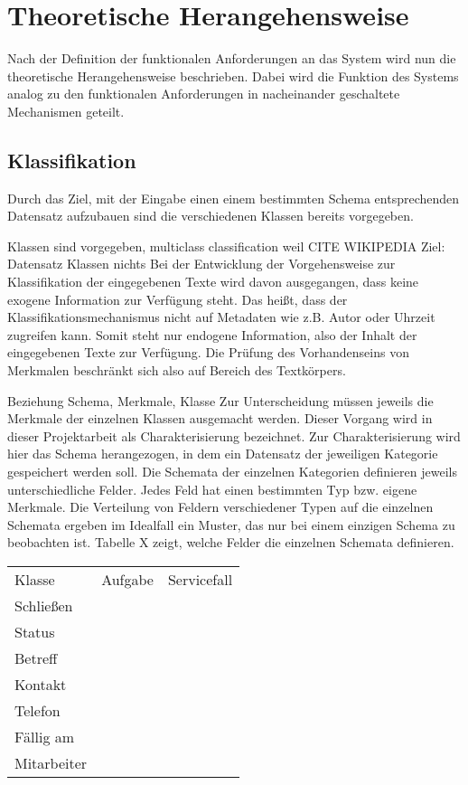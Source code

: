 \chapter{Theoretische Herangehensweise}
Nach der Definition der funktionalen Anforderungen an das System wird nun die theoretische Herangehensweise beschrieben. Dabei wird die Funktion des Systems analog zu den funktionalen Anforderungen in nacheinander geschaltete Mechanismen geteilt.

\section{Klassifikation}
Durch das Ziel, mit der Eingabe einen einem bestimmten Schema entsprechenden Datensatz aufzubauen sind die verschiedenen Klassen bereits vorgegeben. 

Klassen sind vorgegeben, multiclass classification weil CITE WIKIPEDIA
Ziel: Datensatz
Klassen nichts
Bei der Entwicklung der Vorgehensweise zur Klassifikation der eingegebenen Texte wird davon ausgegangen, dass keine exogene Information zur Verfügung steht. Das heißt, dass der Klassifikationsmechanismus nicht auf Metadaten wie z.B. Autor oder Uhrzeit zugreifen kann. Somit steht nur endogene Information, also der Inhalt der eingegebenen Texte zur Verfügung. Die Prüfung des Vorhandenseins von Merkmalen beschränkt sich also auf Bereich des Textkörpers. \cite{sebastiano}

Beziehung Schema, Merkmale, Klasse
Zur Unterscheidung müssen jeweils die Merkmale der einzelnen Klassen ausgemacht werden. Dieser Vorgang wird in dieser Projektarbeit als Charakterisierung bezeichnet. Zur Charakterisierung wird hier das Schema herangezogen, in dem ein Datensatz der jeweiligen Kategorie gespeichert werden soll. Die Schemata der einzelnen Kategorien definieren jeweils unterschiedliche Felder. 
Jedes Feld hat einen bestimmten Typ bzw. eigene Merkmale.
Die Verteilung von Feldern verschiedener Typen auf die einzelnen Schemata ergeben im Idealfall ein Muster, das nur bei einem einzigen Schema zu beobachten ist.
Tabelle X zeigt, welche Felder die einzelnen Schemata definieren.

\begin{tabular}{lll}
    Klasse & Aufgabe & Servicefall \\
    Schließen \\
    Status \\
    Betreff \\
    Kontakt \\
    Telefon \\
    Fällig am \\
    Mitarbeiter \\
\end{tabular}

